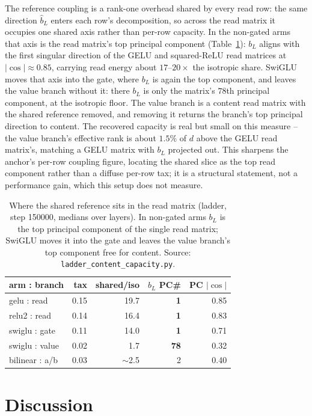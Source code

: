 \documentclass[11pt]{article}
\newcommand{\bl}{b_L}
\newcommand{\blh}{\hat{b}_L}
\begin{document}
The reference coupling is a rank-one overhead shared by every read row: the same
direction $\blh$ enters each row's decomposition, so across the read matrix it
occupies one shared axis rather than per-row capacity. In the non-gated arms that
axis is the read matrix's top principal component (Table~\ref{tab:capacity}):
$\bl$ aligns with the first singular direction of the GELU and squared-ReLU read
matrices at $|\cos| \approx 0.85$, carrying read energy about $17$--$20\times$ the
isotropic share. SwiGLU moves that axis into the gate, where $\bl$ is again the
top component, and leaves the value branch without it: there $\bl$ is only the
matrix's $78$th principal component, at the isotropic floor. The value branch is a
content read matrix with the shared reference removed, and removing it returns the
branch's top principal direction to content. The recovered capacity is real but
small on this measure -- the value branch's effective rank is about $1.5\%$ of $d$
above the GELU read matrix's, matching a GELU matrix with $\bl$ projected out. This
sharpens the anchor's per-row coupling figure, locating the shared slice as the
top read component rather than a diffuse per-row tax; it is a structural
statement, not a performance gain, which this setup does not measure.

\begin{table}[t]
\centering\small
\begin{tabular}{lrrrr}
\toprule
arm : branch & tax & shared/iso & $\bl$ PC\# & PC $|\cos|$ \\
\midrule
gelu : read     & 0.15 & 19.7 & \textbf{1}  & 0.85 \\
relu2 : read    & 0.14 & 16.4 & \textbf{1}  & 0.83 \\
swiglu : gate   & 0.11 & 14.0 & \textbf{1}  & 0.71 \\
swiglu : value  & 0.02 &  1.7 & \textbf{78} & 0.32 \\
bilinear : a/b  & 0.03 & $\sim$2.5 & 2 & 0.40 \\
\bottomrule
\end{tabular}
\caption{Where the shared reference sits in the read matrix (ladder, step
150000, medians over layers). In non-gated arms $\bl$ is the top principal
component of the single read matrix; SwiGLU moves it into the gate and leaves
the value branch's top component free for content. Source:
\texttt{ladder\_content\_capacity.py}.}
\label{tab:capacity}
\end{table}

\section{Discussion}
\label{sec:discussion}
\end{document}
